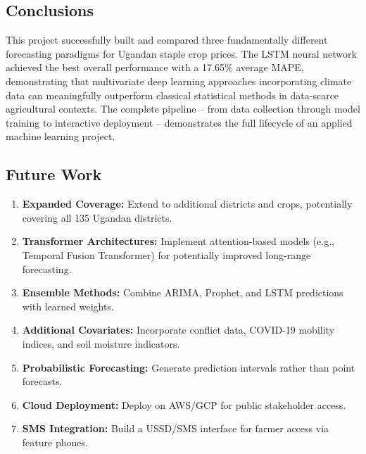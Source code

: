 \documentclass[12pt,a4paper]{article}
\begin{document}
\subsection{Conclusions}
This project successfully built and compared three fundamentally different forecasting paradigms for Ugandan staple crop prices. The LSTM neural network achieved the best overall performance with a 17.65\% average MAPE, demonstrating that multivariate deep learning approaches incorporating climate data can meaningfully outperform classical statistical methods in data-scarce agricultural contexts. The complete pipeline -- from data collection through model training to interactive deployment -- demonstrates the full lifecycle of an applied machine learning project.

\subsection{Future Work}
\begin{enumerate}
    \item \textbf{Expanded Coverage:} Extend to additional districts and crops, potentially covering all 135 Ugandan districts.
    \item \textbf{Transformer Architectures:} Implement attention-based models (e.g., Temporal Fusion Transformer) for potentially improved long-range forecasting.
    \item \textbf{Ensemble Methods:} Combine ARIMA, Prophet, and LSTM predictions with learned weights.
    \item \textbf{Additional Covariates:} Incorporate conflict data, COVID-19 mobility indices, and soil moisture indicators.
    \item \textbf{Probabilistic Forecasting:} Generate prediction intervals rather than point forecasts.
    \item \textbf{Cloud Deployment:} Deploy on AWS/GCP for public stakeholder access.
    \item \textbf{SMS Integration:} Build a USSD/SMS interface for farmer access via feature phones.
\end{enumerate}
\end{document}
